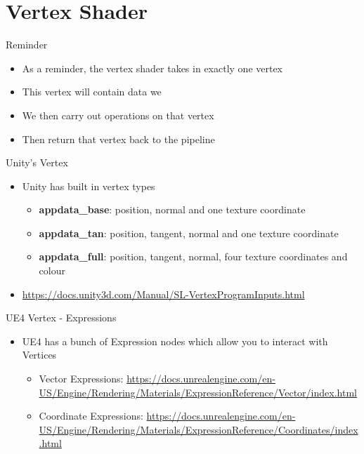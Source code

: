 \part{Vertex Shader}
\frame{\partpage}

\begin{frame}{Reminder}
	\begin{itemize}
		\item As a reminder, the vertex shader takes in exactly one vertex
		\pause \item This vertex will contain data we 
		\pause \item We then carry out operations on that vertex
		\pause \item Then return that vertex back to the pipeline
	\end{itemize}
\end{frame}

\begin{frame}{Unity's Vertex}
	\begin{itemize}
		\item Unity has built in vertex types
		\begin{itemize}
			\pause \item \textbf{appdata\_base}: position, normal and one texture coordinate
			\pause \item \textbf{appdata\_tan}: position, tangent, normal and one texture coordinate
			\pause \item \textbf{appdata\_full}: position, tangent, normal, four texture coordinates and colour
		\end{itemize}
		\pause \item \url{https://docs.unity3d.com/Manual/SL-VertexProgramInputs.html}
	\end{itemize}
\end{frame}

\begin{frame}{UE4 Vertex - Expressions}
	\begin{itemize}
		\item UE4 has a bunch of Expression nodes which allow you to interact with Vertices
		\begin{itemize}
			\pause \item Vector Expressions: \url{https://docs.unrealengine.com/en-US/Engine/Rendering/Materials/ExpressionReference/Vector/index.html}
			\pause \item Coordinate Expressions: \url{https://docs.unrealengine.com/en-US/Engine/Rendering/Materials/ExpressionReference/Coordinates/index.html}
		\end{itemize}
	\end{itemize}
\end{frame}

